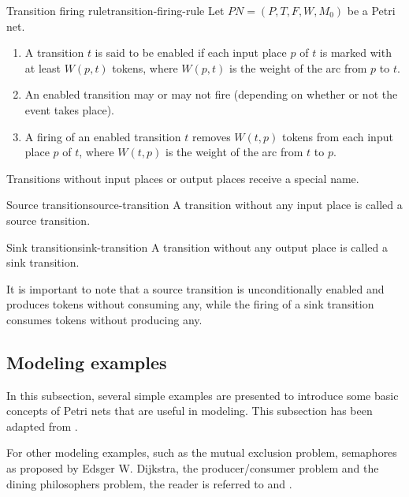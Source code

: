 \begin{definition}{Transition firing rule}{transition-firing-rule}
    Let $ PN = (P, T, F, W, M_{0}) $ be a Petri net.
    \begin{enumerate}[label=(\roman*)]
        \item A transition $t$ is said to be enabled if each input place $p$ of $t$
              is marked with at least $W(p, t)$ tokens, where $W(p,t)$ is the weight of the arc from $p$ to $t$.
        \item An enabled transition may or may not fire (depending on whether or not the event takes place).
        \item A firing of an enabled transition $t$ removes $W(t,p)$ tokens from each input place $p$ of $t$,
              where $W(t, p)$ is the weight of the arc from $t$ to $p$.
    \end{enumerate}
\end{definition}

Transitions without input places or output places receive a special name.

\begin{definition}{Source transition}{source-transition}
    A transition without any input place is called a source transition.
\end{definition}

\begin{definition}{Sink transition}{sink-transition}
    A transition without any output place is called a sink transition.
\end{definition}

It is important to note that a source transition is unconditionally enabled
and produces tokens without consuming any, while the firing of a sink transition
consumes tokens without producing any.

\subsection{Modeling examples}

In this subsection, several simple examples are presented to introduce
some basic concepts of Petri nets that are useful in modeling.
This subsection has been adapted from \cite{murata1989}.

For other modeling examples, such as the mutual exclusion problem,
semaphores as proposed by Edsger W. Dijkstra, the producer/consumer problem
and the dining philosophers problem, the reader is referred to
\cite[Chapter 3]{peterson1981} and \cite{reisig2013}.

